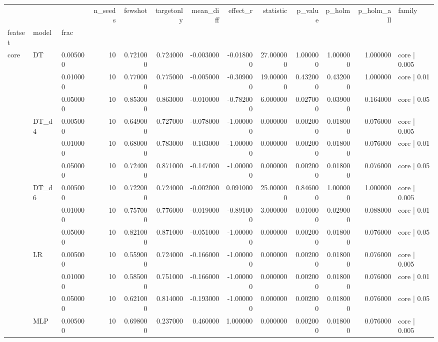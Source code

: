 \begin{tabular}{lllrrrrrrrrrl}
\toprule
 &  &  & n_seeds & fewshot & targetonly & mean_diff & effect_r & statistic & p_value & p_holm & p_holm_all & family \\
featset & model & frac &  &  &  &  &  &  &  &  &  &  \\
\midrule
\multirow[t]{27}{*}{core} & \multirow[t]{3}{*}{DT} & 0.005000 & 10 & 0.721000 & 0.724000 & -0.003000 & -0.018000 & 27.000000 & 1.000000 & 1.000000 & 1.000000 & core | 0.005 \\
 &  & 0.010000 & 10 & 0.770000 & 0.775000 & -0.005000 & -0.309000 & 19.000000 & 0.432000 & 0.432000 & 1.000000 & core | 0.01 \\
 &  & 0.050000 & 10 & 0.853000 & 0.863000 & -0.010000 & -0.782000 & 6.000000 & 0.027000 & 0.039000 & 0.164000 & core | 0.05 \\
\cline{2-13}
 & \multirow[t]{3}{*}{DT_d4} & 0.005000 & 10 & 0.649000 & 0.727000 & -0.078000 & -1.000000 & 0.000000 & 0.002000 & 0.018000 & 0.076000 & core | 0.005 \\
 &  & 0.010000 & 10 & 0.680000 & 0.783000 & -0.103000 & -1.000000 & 0.000000 & 0.002000 & 0.018000 & 0.076000 & core | 0.01 \\
 &  & 0.050000 & 10 & 0.724000 & 0.871000 & -0.147000 & -1.000000 & 0.000000 & 0.002000 & 0.018000 & 0.076000 & core | 0.05 \\
\cline{2-13}
 & \multirow[t]{3}{*}{DT_d6} & 0.005000 & 10 & 0.722000 & 0.724000 & -0.002000 & 0.091000 & 25.000000 & 0.846000 & 1.000000 & 1.000000 & core | 0.005 \\
 &  & 0.010000 & 10 & 0.757000 & 0.776000 & -0.019000 & -0.891000 & 3.000000 & 0.010000 & 0.029000 & 0.088000 & core | 0.01 \\
 &  & 0.050000 & 10 & 0.821000 & 0.871000 & -0.051000 & -1.000000 & 0.000000 & 0.002000 & 0.018000 & 0.076000 & core | 0.05 \\
\cline{2-13}
 & \multirow[t]{3}{*}{LR} & 0.005000 & 10 & 0.559000 & 0.724000 & -0.166000 & -1.000000 & 0.000000 & 0.002000 & 0.018000 & 0.076000 & core | 0.005 \\
 &  & 0.010000 & 10 & 0.585000 & 0.751000 & -0.166000 & -1.000000 & 0.000000 & 0.002000 & 0.018000 & 0.076000 & core | 0.01 \\
 &  & 0.050000 & 10 & 0.621000 & 0.814000 & -0.193000 & -1.000000 & 0.000000 & 0.002000 & 0.018000 & 0.076000 & core | 0.05 \\
\cline{2-13}
 & \multirow[t]{3}{*}{MLP} & 0.005000 & 10 & 0.698000 & 0.237000 & 0.460000 & 1.000000 & 0.000000 & 0.002000 & 0.018000 & 0.076000 & core | 0.005 \\

\end{tabular}
